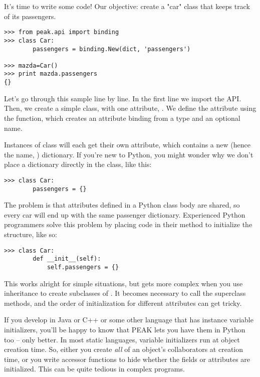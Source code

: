 It's time to write some code!  Our objective: create a "car" class 
that keeps track of its passengers.

\begin{verbatim}
>>> from peak.api import binding
>>> class Car:
        passengers = binding.New(dict, 'passengers')
	
>>> mazda=Car()
>>> print mazda.passengers
{}

\end{verbatim}

Let's go through this sample line by line.  In the first line we import the
 API.  Then, we create a simple class, with one attribute,
.  We define the attribute using the 
function, which creates an attribute binding from a type and an optional name.

Instances of class  will each get their own 
attribute, which contains a new (hence the name, )
dictionary.  If you're new to Python, you might wonder why we don't place a
dictionary directly in the class, like this:

\begin{verbatim}
>>> class Car:
        passengers = {}

\end{verbatim}

The problem is that attributes defined in a Python class body are shared, so
every car will end up with the same passenger dictionary.  Experienced Python
programmers solve this problem by placing code in their 
method to initialize the structure, like so:



\begin{verbatim}
>>> class Car:
        def __init__(self):
            self.passengers = {}

\end{verbatim}

This works alright for simple situations, but gets more complex when you use
inheritance to create subclasses of .  It becomes necessary to
call the superclass  methods, and the order of initialization
for different attributes can get tricky.

If you develop in Java or C++ or some other language that has instance
variable initializers, you'll be happy to know that PEAK lets you have them
in Python too -- only better.  In most static languages, variable initializers
run at object creation time.  So, either you create \emph{all} of an object's
collaborators at creation time, or you write accessor functions to hide
whether the fields or attributes are initialized.  This can be quite tedious
in complex programs.

